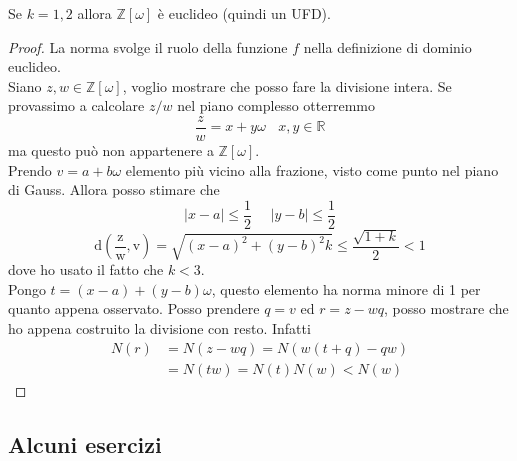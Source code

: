 \begin{proposizione}
	Se $k=1,2$ allora $\mathbb{Z}[\omega]$ è euclideo (quindi un UFD).
\end{proposizione}
\begin{proof}
	La norma svolge il ruolo della funzione $f$ nella definizione di dominio euclideo.\\ Siano $z,w\in\mathbb{Z}[\omega]$, voglio mostrare che posso fare la divisione intera.
	Se provassimo a calcolare $z/w$ nel piano complesso otterremmo 
	\begin{equation*}
	\frac{z}{w}=x+y\omega \ \ \ \ x,y\in\mathbb{R}
	\end{equation*}
	ma questo può non appartenere a $\mathbb{Z}[\omega]$. \\ Prendo $v=a+b\omega$ elemento più vicino alla frazione, visto come punto nel piano di Gauss. Allora posso stimare che 
	\begin{equation*}
	|x-a|\leq\frac{1}{2} \ \ \ \ \ \ |y-b|\leq\frac{1}{2}
	\end{equation*}
	\begin{equation*}
	\operatorname{d\left(\frac{z}{w},v\right)}=\sqrt{(x-a)^2+(y-b)^2k}\leq\frac{\sqrt{1+k}}{2}<1
	\end{equation*}
	dove ho usato il fatto che $k<3$. \\ Pongo $t=(x-a)+(y-b)\omega$, questo elemento ha norma minore di 1 per quanto appena osservato. Posso prendere $q=v$ ed $r=z-wq$, posso mostrare che ho appena costruito la divisione con resto. Infatti
	\begin{align*}
	N(r)&=N(z-wq)=N\left(w(t+q)-qw\right)\\
	&=N(tw)=N(t)N(w)<N(w)
	\end{align*}
\end{proof}
\subsection{Alcuni esercizi}

